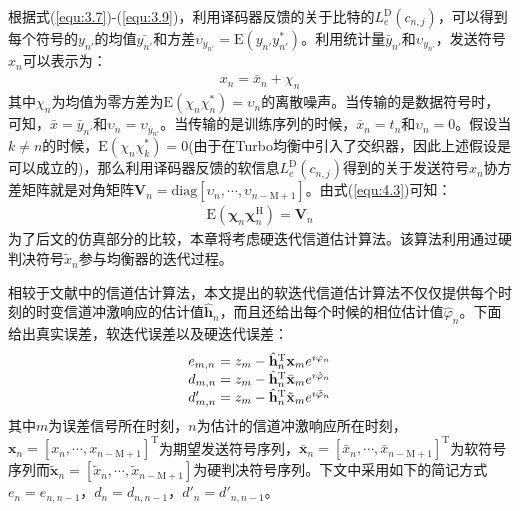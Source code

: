 根据式(\ref{equ:3.7})-(\ref{equ:3.9})，利用译码器反馈的关于比特的$L_e^{\mathrm{D}}(c_{n,j})$，可以得到每个符号的$y_{{n}'}$的均值$\bar{y_{{n}'}}$和方差$\upsilon_{y_{{n}'}}=\mathrm{E}(y_{{n}'}y_{{n}'}^*)$。利用统计量$\bar{y}_{{n}'}$和$\upsilon_{y_{{n}'}}$，发送符号$x_n$可以表示为：
\begin{eqnarray}
    x_n=\bar{x}_n+\chi_n
    \label{equ:4.3}
\end{eqnarray}
其中$\chi_n$为均值为零方差为$\mathrm{E}(\chi_n\chi_n^*)=\upsilon_n$的离散噪声。当传输的是数据符号时，可知，$\bar{x}=\bar{y}_{{n}'}$和$\upsilon_n=\upsilon_{y_{{n}'}}$。当传输的是训练序列的时候，$\bar{x}_n=t_n$和$\upsilon_n=0$。假设当$k\neq
n$的时候，$\mathrm{E}(\chi_n\chi_k^*)=0$(由于在Turbo均衡中引入了交织器，因此上述假设是可以成立的)，那么利用译码器反馈的软信息$L_e^{\mathrm{D}}(c_{n,j})$得到的关于发送符号$x_n$协方差矩阵就是对角矩阵$\mathbf{V}_n=\mathrm{diag}[\upsilon_n,\cdots,\upsilon_{n-\mathrm{M}+1}]$。由式(\ref{equ:4.3})可知：
\begin{eqnarray}
    \mathrm{E}(\boldsymbol{\chi}_n\boldsymbol{\chi}_n^{\mathrm{H}})=\mathbf{V}_n
    \label{equ:4.4}
\end{eqnarray}
为了后文的仿真部分的比较，本章将考虑硬迭代信道估计算法。该算法利用通过硬判决符号$\tilde{x}_n$参与均衡器的迭代过程。

相较于文献中的信道估计算法，本文提出的软迭代信道估计算法不仅仅提供每个时刻的时变信道冲激响应的估计值$\hat{\mathbf{h}}_n$，而且还给出每个时候的相位估计值$\hat{\varphi}_n$。下面给出真实误差，软迭代误差以及硬迭代误差：
\begin{eqnarray}
    \begin{array}{l@{\;=\;}l}
        e_{m,n}&z_m-\hat{\mathbf{h}}_n^{\mathrm{T}}\mathbf{x}_me^{\imath\varphi_n}\\
        d_{m,n}&z_m-\hat{\mathbf{h}}_n^{\mathrm{T}}\bar{\mathbf{x}}_me^{\imath\hat{\varphi}_n}\\
        {d}'_{m,n}&z_m-\hat{\mathbf{h}}_n^{\mathrm{T}}\tilde{\mathbf{x}}_me^{\imath\tilde{\varphi}_n}\\
    \end{array}
    \label{equ:4.5}
\end{eqnarray}
其中$m$为误差信号所在时刻，$n$为估计的信道冲激响应所在时刻，$\mathbf{x}_n=[x_n,\cdots,x_{n-\mathrm{M}+1}]^{\mathrm{T}}$为期望发送符号序列，$\bar{\mathbf{x}}_n=[\bar{x}_n,\cdots,\bar{x}_{n-\mathrm{M}+1}]^{\mathrm{T}}$为软符号序列而$\tilde{\mathbf{x}}_n=[\tilde{x}_n,\cdots,\tilde{x}_{n-\mathrm{M}+1}]$为硬判决符号序列。下文中采用如下的简记方式$e_n=e_{n,n-1}\mbox{，}d_n=d_{n,n-1}\mbox{，}{d}'_n={d}'_{n,n-1}$。
